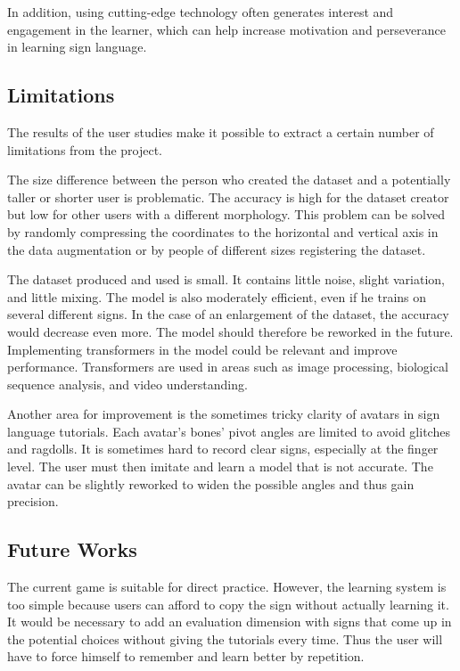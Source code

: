 In addition, using cutting-edge technology often generates interest and engagement in the learner, which can help increase motivation and perseverance in learning sign language.

\subsection{Limitations}

The results of the user studies make it possible to extract a certain number of limitations from the project.

The size difference between the person who created the dataset and a potentially taller or shorter user is problematic. The accuracy is high for the dataset creator but low for other users with a different morphology. This problem can be solved by randomly compressing the coordinates to the horizontal and vertical axis in the data augmentation or by people of different sizes registering the dataset.

The dataset produced and used is small. It contains little noise, slight variation, and little mixing. The model is also moderately efficient, even if he trains on several different signs. In the case of an enlargement of the dataset, the accuracy would decrease even more. The model should therefore be reworked in the future. Implementing transformers in the model could be relevant and improve performance. Transformers are used in areas such as image processing, biological sequence analysis, and video understanding.

Another area for improvement is the sometimes tricky clarity of avatars in sign language tutorials. Each avatar's bones' pivot angles are limited to avoid glitches and ragdolls. It is sometimes hard to record clear signs, especially at the finger level. The user must then imitate and learn a model that is not accurate. The avatar can be slightly reworked to widen the possible angles and thus gain precision.

\subsection{Future Works}

The current game is suitable for direct practice. However, the learning system is too simple because users can afford to copy the sign without actually learning it. It would be necessary to add an evaluation dimension with signs that come up in the potential choices without giving the tutorials every time. Thus the user will have to force himself to remember and learn better by repetition.

